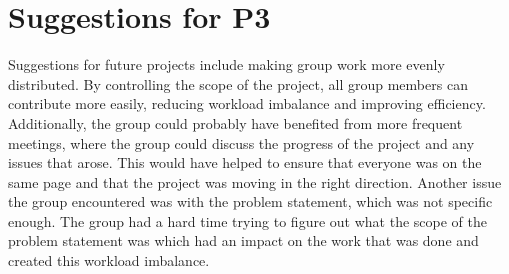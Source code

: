 \section{Suggestions for P3}\label{sec:suggestions-for-p3}
Suggestions for future projects include making group work more evenly distributed.
By controlling the scope of the project, all group members can contribute more easily, reducing workload imbalance and
improving efficiency.
Additionally, the group could probably have benefited from more frequent meetings, where the group could discuss the
progress of the project and any issues that arose.
This would have helped to ensure that everyone was on the same page and that the
project was moving in the right direction.
Another issue the group encountered was with the problem statement, which was not specific enough.
The group had a hard time trying to figure out what the scope of the problem statement was which had
an impact on the work that was done and created this workload imbalance.
